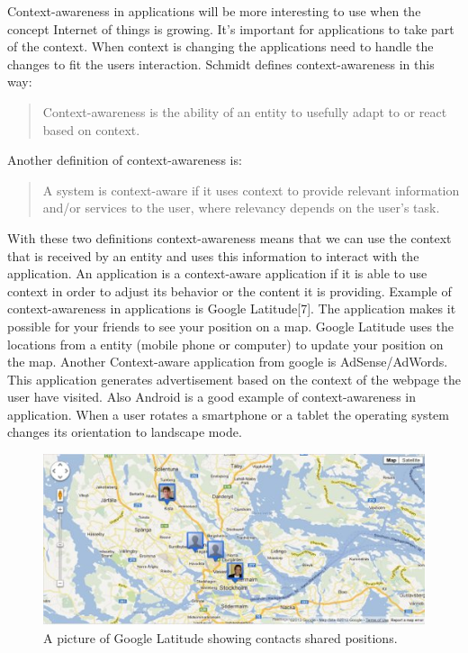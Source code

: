 Context-awareness in applications will be more interesting to use when the concept Internet of things is growing. It's important for applications to take part of the context. When context is changing the applications need to handle the changes to fit the users interaction. Schmidt defines context-awareness in this way:

\begin{quotation}
Context-awareness is the ability of an entity to usefully adapt to or react based on context. \cite{dey2001understanding}
\end{quotation}

Another definition of context-awareness is:

\begin{quotation}
A system is context-aware if it uses context to provide relevant information and\slash or services to the user, where relevancy depends on the user's task. \cite{abowd1999towards}
\end{quotation}

With these two definitions context-awareness means that we can use the context that is received by an entity and uses this information to interact with the application. An application is a context-aware application if it is able to use context in order to adjust its behavior or the content it is providing. Example of context-awareness in applications is Google Latitude[7]. The application makes it possible for your friends to see your position on a map. Google Latitude uses the locations from a entity (mobile phone or computer) to update your position on the map. Another Context-aware application from google is AdSense/AdWords. This application generates advertisement based on the context of the webpage the user have visited. 
Also Android is a good example of context-awareness in application. When a user rotates a smartphone or a tablet the operating system changes its orientation to landscape mode.

\begin{figure}[H]
	\centering
    	\includegraphics[scale=0.75]{part_2/context_awareness/latitude_pic.jpg}
		\caption{A picture of Google Latitude showing contacts shared positions.} 
\end{figure}
	
